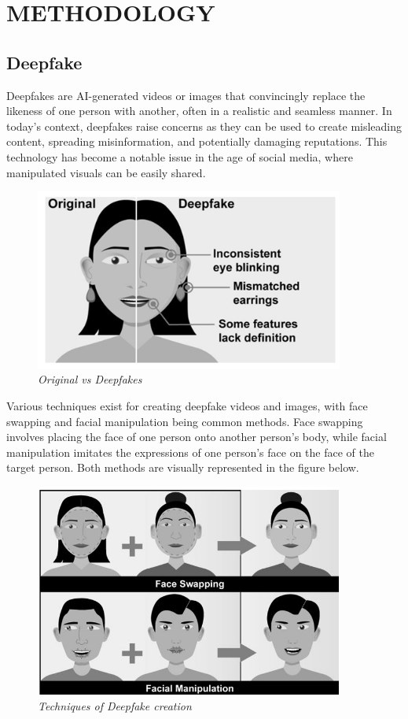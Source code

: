 \section{METHODOLOGY}
\subsection{Deepfake}
Deepfakes are AI-generated videos or images that convincingly replace the likeness of one person with another, often in a realistic and seamless manner. In today's context, deepfakes raise concerns as they can be used to create misleading content, spreading misinformation, and potentially damaging reputations. This technology has become a notable issue in the age of social media, where manipulated visuals can be easily shared.\\

\begin{figure}[htbp]
    \centering
    \includegraphics[width=4in]{img/deefakeface.png}
    \caption{\textit{Original vs Deepfakes }}
\end{figure}

Various techniques exist for creating deepfake videos and images, with face swapping and facial manipulation being common methods. Face swapping involves placing the face of one person onto another person's body, while facial manipulation imitates the expressions of one person's face on the face of the target person. Both methods are visually represented in the figure below.\\

\begin{figure}[htbp]
    \centering
    \includegraphics[width=4in]{img/face manipulation.png}
    \caption{\textit{Techniques of Deepfake creation}}
\end{figure}

\newpage


